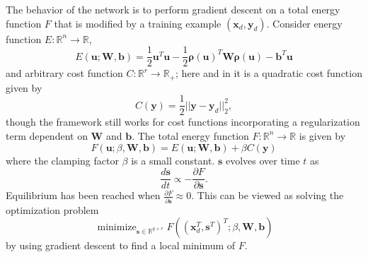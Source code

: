 \documentclass[utf8]{frontiersSCNS}
\newcommand{\mtx}[1]{\bm{#1}}
\DeclareMathOperator*{\minimize}{minimize}
\begin{document}
The behavior of the network is to perform gradient descent on a total energy function $F$ that is modified by a training example $(\mtx{x}_d,\mtx{y}_d)$. Consider energy function $E:\mathbb{R}^n\to\mathbb{R}$,
\begin{equation}
E(\mtx{u}; \mtx{W}, \mtx{b})=\frac{1}{2}\mtx{u}^T\mtx{u}-\frac{1}{2}\mtx{\rho}(\mtx{u})^T \mtx{W} \mtx{\rho}(\mtx{u})-\mtx{b}^T\mtx{u} \label{eqn:energy}
\end{equation}
and arbitrary cost function $C:\mathbb{R}^r\to\mathbb{R}_{+}$; here and in \citep{scellier17} it is a quadratic cost function given by
\begin{equation}
C(\mtx{y})=\frac{1}{2}||\mtx{y}-\mtx{y}_d||_2^2, \label{eqn:cost}
\end{equation}
though the framework still works for cost functions incorporating a regularization term dependent on $\mtx{W}$ and $\mtx{b}$. The total energy function $F:\mathbb{R}^n\to\mathbb{R}$ is given by
\begin{equation}
F(\mtx{u}; \beta, \mtx{W}, \mtx{b})=E(\mtx{u};\mtx{W}, \mtx{b})+\beta C(\mtx{y}) \label{eqn:total_energy}
\end{equation}
where the clamping factor $\beta$ is a small constant. $\mtx{s}$ evolves over time $t$ as
\begin{equation}
\frac{d\mtx{s}}{dt}\propto -\frac{\partial F}{\partial \mtx{s}}. \label{eqn:dynamics}
\end{equation}
Equilibrium has been reached when $\frac{\partial F}{\partial \mtx{s}} \approx 0$. This can be viewed as solving the optimization problem
\begin{equation}
\minimize_{\mtx{s}\in\mathbb{R}^{q+r}}F((\mtx{x}_d^T,\mtx{s}^T)^T; \beta, \mtx{W}, \mtx{b}) 
\end{equation}
by using gradient descent to find a local minimum of $F$.
\end{document}
